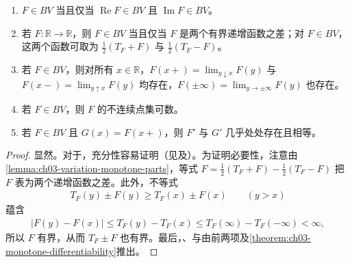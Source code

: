 \documentclass[../../main.tex]{subfiles}%
\begin{document}
\begin{theorem}\label{theorem:ch03-bv-properties}
\begin{enumerate}
\item\label{item:ch03-bv-real-imag} $F\in BV$ 当且仅当 $\operatorname{Re}F\in BV$ 且 $\operatorname{Im}F\in BV$。
\item\label{item:ch03-bv-difference-monotone} 若 $F:\mathbb R\to\mathbb R$，则 $F\in BV$ 当且仅当 $F$ 是两个有界递增函数之差；对 $F\in BV$，这两个函数可取为 $\tfrac12(T_F+F)$ 与 $\tfrac12(T_F-F)$。
\item\label{item:ch03-bv-one-sided-limits} 若 $F\in BV$，则对所有 $x\in\mathbb R$，$F(x+)=\lim_{y\downarrow x}F(y)$ 与 $F(x-)=\lim_{y\uparrow x}F(y)$ 均存在，$F(\pm\infty)=\lim_{y\to\pm\infty}F(y)$ 也存在。
\item\label{item:ch03-bv-discontinuities} 若 $F\in BV$，则 $F$ 的不连续点集可数。
\item\label{item:ch03-bv-derivatives} 若 $F\in BV$ 且 $G(x)=F(x+)$，则 $F'$ 与 $G'$ 几乎处处存在且相等。
\end{enumerate}
\end{theorem}
\begin{proof}
显然。对于，充分性容易证明（见及）。为证明必要性，注意由\cref{lemma:ch03-variation-monotone-parts}，等式 $F=\tfrac12(T_F+F)-\tfrac12(T_F-F)$ 把 $F$ 表为两个递增函数之差。此外，不等式
\begin{align*}
T_F(y)\pm F(y)\ge T_F(x)\pm F(x)\qquad(y>x)
\end{align*}
蕴含
\begin{align*}
|F(y)-F(x)|\le T_F(y)-T_F(x)\le T_F(\infty)-T_F(-\infty)<\infty,
\end{align*}
所以 $F$ 有界，从而 $T_F\pm F$ 也有界。最后，、与由前两项及\cref{theorem:ch03-monotone-differentiability}推出。
\end{proof}
\end{document}
